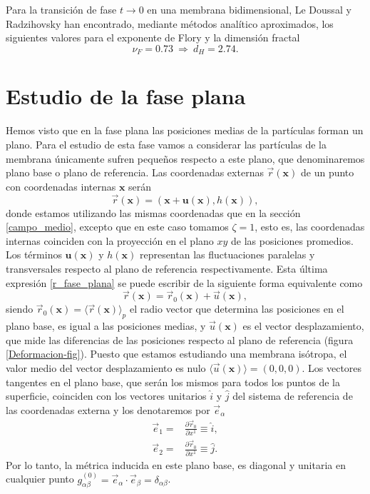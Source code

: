 Para la transición de fase $t\rightarrow 0$ en una membrana bidimensional,
Le Doussal y Radzihovsky \cite{Doussal:nu} han encontrado, mediante métodos analítico aproximados,
los siguientes valores para el exponente de Flory y la dimensión fractal 
\begin{equation*} 
 \nu_F=0.73\ \Rightarrow\ d_H=2.74 .
\end{equation*}

\section{Estudio de la fase plana}

Hemos visto que en la fase plana las posiciones medias de la partículas forman
un plano. Para el estudio de esta fase vamos a considerar las partículas de la
membrana únicamente sufren pequeños respecto a este plano, que denominaremos
plano base o plano de referencia. Las coordenadas externas
$\vec{r}(\mathbf{x})$ de un punto con coordenadas internas $\mathbf{x}$ serán
\begin{equation}\label{r_fase_plana}
\vec{r}(\mathbf{x})=(\mathbf{x}+\mathbf{u(\mathbf{x})},h(\mathbf{x})),
\end{equation}
donde estamos utilizando las mismas coordenadas que en la sección \ref{campo_medio}, excepto que en
este caso tomamos $\zeta=1$, esto es, las coordenadas internas coinciden con
la proyección en el plano $xy$ de las posiciones promedios. Los términos
$\mathbf{u(\mathbf{x})}$ y $h(\mathbf{x})$ representan las fluctuaciones
paralelas y transversales respecto al plano de
referencia respectivamente. Esta última
expresión \eqref{r_fase_plana} se puede escribir de la siguiente forma
equivalente como
\begin{equation}\label{deformacion}
\vec{r}(\mathbf{x})=\vec{r}_0(\mathbf{x})+\vec{u}(\mathbf{x}),
\end{equation}
siendo $\vec{r}_0(\mathbf{x})=\langle\vec{r}(\mathbf{x}) \rangle_p$ el radio
vector que determina las posiciones en el plano base, es igual a las
posiciones medias, y $\vec{u}(\mathbf{x})$ es el vector desplazamiento, que
mide las diferencias de las posiciones respecto al plano de referencia (figura
\ref{Deformacion-fig}). Puesto
que estamos estudiando una membrana isótropa, el valor medio del
vector desplazamiento es nulo $\langle\vec{u}(\mathbf{x}) \rangle=(0,0,0)$.
Los vectores tangentes en el plano base, que serán los mismos para todos los
puntos de la superficie, coinciden con los vectores unitarios $\hat{i}$ y
$\hat{j}$ del sistema de referencia de las coordenadas externa y los denotaremos por $\vec{e}_\alpha$
\begin{align*}
 \vec{e}_1=&\frac{\partial \vec{r}_0}{\partial x^1}\equiv \hat{i},\\
 \vec{e}_2=&\frac{\partial \vec{r}_0}{\partial x^1}\equiv \hat{j}.
\end{align*}
Por lo tanto, la métrica inducida en
este plano base, es diagonal y unitaria en cualquier punto
$g^{(0)}_{\alpha\beta}=\vec{e}_{\alpha}\cdot\vec{e}_{\beta}
=\delta_{\alpha\beta}$. 

